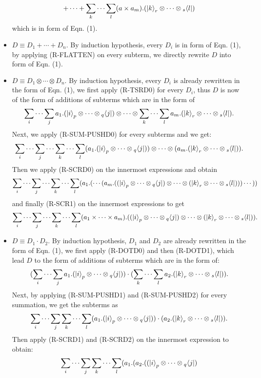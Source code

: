 \begin{itemize}
$$  + \cdots +
  \sum_{k}\cdots\sum_{l} (a \times a_m) . (\ket{k}_{r} \otimes \cdots \otimes {}_s\langle l|)$$
  which is in form of Eqn. (1).
  \item $D \equiv D_1 + \cdots + D_n$. By induction hypothesis, every $D_i$ is in form of Eqn. (1), by applying (R-FLATTEN) on every subterm, we directly rewrite $D$ into form of Eqn. (1).
  \item $D \equiv D_1\otimes \cdots \otimes D_n$. By induction hypothesis, every $D_i$ is already rewritten in the form of Eqn. (1), we first apply (R-TSRD0) for every $D_i$, thus $D$ is now of the form of additions of subterms which are in the form of 
  $$
  \sum_{i}\cdots\sum_{j} a_1 . (\ket{i}_{p} \otimes \cdots \otimes {}_q\langle j|)
  \otimes \cdots \otimes
  \sum_{k}\cdots\sum_{l} a_m . (\ket{k}_{r} \otimes \cdots \otimes {}_s\langle l|).
  $$
  Next, we apply (R-SUM-PUSHD0) for every subterms and we get:
  $$
  \sum_{i}\cdots\sum_{j}\cdots\sum_{k}\cdots\sum_{l} (a_1 . (\ket{i}_{p} \otimes \cdots \otimes {}_q\langle j|))
  \otimes \cdots \otimes
  (a_m . (\ket{k}_{r} \otimes \cdots \otimes {}_s\langle l|)).
  $$
  Then we apply (R-SCRD0) on the innermost expressions and obtain
  $$
  \sum_{i}\cdots\sum_{j}\cdots\sum_{k}\cdots\sum_{l} (a_1.( \cdots (a_m . ((\ket{i}_{p} \otimes \cdots \otimes {}_q\langle j|)
  \otimes \cdots \otimes
  (\ket{k}_{r} \otimes \cdots \otimes {}_s\langle l|))) \cdots ))
  $$
  and finally (R-SCR1) on the innermost expressions to get
  $$
  \sum_{i}\cdots\sum_{j}\cdots\sum_{k}\cdots\sum_{l} (a_1\times \cdots \times a_m) . ((\ket{i}_{p} \otimes \cdots \otimes {}_q\langle j|)
  \otimes \cdots \otimes
  (\ket{k}_{r} \otimes \cdots \otimes {}_s\langle l|)).
  $$
  \item $D \equiv D_1 \cdot D_2$. By induction hypothesis, $D_1$ and $D_2$ are already rewritten in the form of Eqn. (1), we first apply (R-DOTD0) and then (R-DOTD1), which lead $D$ to the form of additions of subterms which are in the form of:
  $$
  (\sum_{i}\cdots\sum_{j} a_1 . (\ket{i}_{p} \otimes \cdots \otimes {}_q\langle j|))
  \cdot  
  (\sum_{k}\cdots\sum_{l} a_2 . (\ket{k}_{r} \otimes \cdots \otimes {}_s\langle l|)).
  $$
  Next, by applying (R-SUM-PUSHD1) and (R-SUM-PUSHD2) for every summation, we get the subterms as
  $$
  \sum_{i}\cdots\sum_{j}\sum_{k}\cdots\sum_{l} (a_1 . (\ket{i}_{p} \otimes \cdots \otimes {}_q\langle j|))
  \cdot  
  (a_2 . (\ket{k}_{r} \otimes \cdots \otimes {}_s\langle l|)).
  $$
  Then apply (R-SCRD1) and (R-SCRD2) on the innermost expression to obtain:
  $$
  \sum_{i}\cdots\sum_{j}\sum_{k}\cdots\sum_{l} (a_1 . (a_2. ((\ket{i}_{p} \otimes \cdots \otimes {}_q\langle j|)
$$
\end{itemize}
